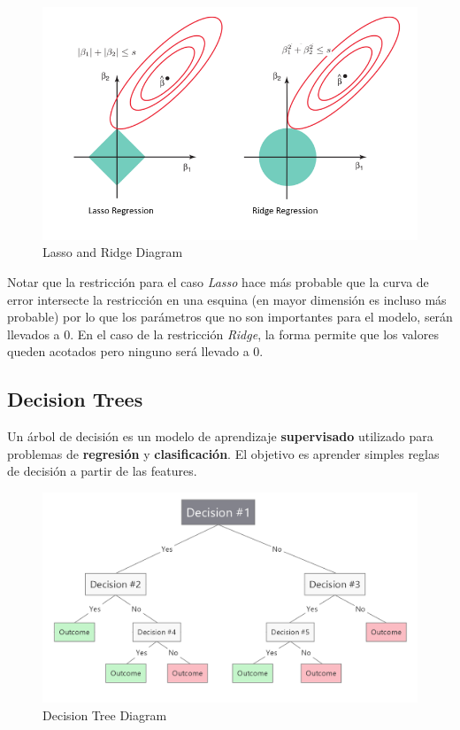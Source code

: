 \begin{figure}[H]
    \center
    \includegraphics[scale=0.5]{notebooks/ML/img/lasso_and_ridge_diagram.png}
    \caption{Lasso and Ridge Diagram}
\end{figure}

Notar que la restricción para el caso \textit{Lasso} hace más probable que la curva de error intersecte la restricción en una esquina (en mayor dimensión es incluso más probable) por lo que los parámetros que no son importantes para el modelo, serán llevados a 0. En el caso de la restricción \textit{Ridge}, la forma permite que los valores queden acotados pero ninguno será llevado a 0.


\subsection{Decision Trees}

Un árbol de decisión es un modelo de aprendizaje \textbf{supervisado} utilizado para problemas de \textbf{regresión} y \textbf{clasificación}. El objetivo es aprender simples reglas de decisión a partir de las features. 

\begin{figure}[H]
    \center
    \includegraphics[scale=0.25]{notebooks/ML/img/decision_tree_diagram.png}
    \caption{Decision Tree Diagram}
\end{figure}

